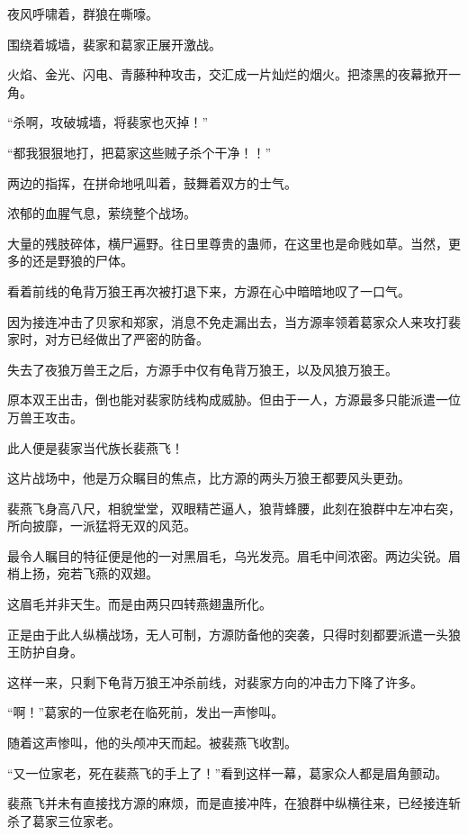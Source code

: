 
\begin{this_body}



夜风呼啸着，群狼在嘶嚎。

围绕着城墙，裴家和葛家正展开激战。

火焰、金光、闪电、青藤种种攻击，交汇成一片灿烂的烟火。把漆黑的夜幕掀开一角。

“杀啊，攻破城墙，将裴家也灭掉！”

“都我狠狠地打，把葛家这些贼子杀个干净！！”

两边的指挥，在拼命地吼叫着，鼓舞着双方的士气。

浓郁的血腥气息，萦绕整个战场。

大量的残肢碎体，横尸遍野。往日里尊贵的蛊师，在这里也是命贱如草。当然，更多的还是野狼的尸体。

看着前线的龟背万狼王再次被打退下来，方源在心中暗暗地叹了一口气。

因为接连冲击了贝家和郑家，消息不免走漏出去，当方源率领着葛家众人来攻打裴家时，对方已经做出了严密的防备。

失去了夜狼万兽王之后，方源手中仅有龟背万狼王，以及风狼万狼王。

原本双王出击，倒也能对裴家防线构成威胁。但由于一人，方源最多只能派遣一位万兽王攻击。

此人便是裴家当代族长裴燕飞！

这片战场中，他是万众瞩目的焦点，比方源的两头万狼王都要风头更劲。

裴燕飞身高八尺，相貌堂堂，双眼精芒逼人，狼背蜂腰，此刻在狼群中左冲右突，所向披靡，一派猛将无双的风范。

最令人瞩目的特征便是他的一对黑眉毛，乌光发亮。眉毛中间浓密。两边尖锐。眉梢上扬，宛若飞燕的双翅。

这眉毛并非天生。而是由两只四转燕翅蛊所化。

正是由于此人纵横战场，无人可制，方源防备他的突袭，只得时刻都要派遣一头狼王防护自身。

这样一来，只剩下龟背万狼王冲杀前线，对裴家方向的冲击力下降了许多。

“啊！”葛家的一位家老在临死前，发出一声惨叫。

随着这声惨叫，他的头颅冲天而起。被裴燕飞收割。

“又一位家老，死在裴燕飞的手上了！”看到这样一幕，葛家众人都是眉角颤动。

裴燕飞并未有直接找方源的麻烦，而是直接冲阵，在狼群中纵横往来，已经接连斩杀了葛家三位家老。


\end{this_body}

